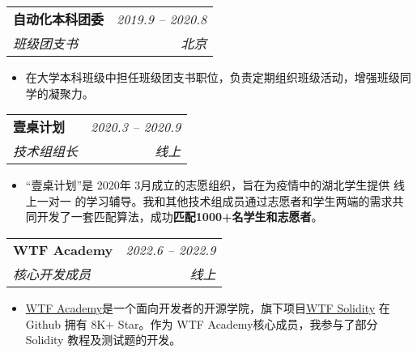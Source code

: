 \documentclass[letterpaper,11pt]{article}
\makeatletter
\newcommand{\resumeItemWithoutColon}[1]{
  \item\small{
    {#1 \vspace{-2pt}}
  }
}
\newcommand{\resumeSubheading}[4]{
  \vspace{0pt}\item
    \begin{tabular*}{0.97\textwidth}[t]{l@{\extracolsep{\fill}}r}
      \textbf{#1} & \textit{\small#2} \\
      \textit{\small#3} & \textit{\small #4} \\
    \end{tabular*}\vspace{-5pt}
}
\newcommand{\resumeItemListStart}{\begin{itemize}[leftmargin=*]}
\newcommand{\resumeItemListEnd}{\end{itemize}\vspace{-5pt}}
\makeatother
\begin{document}
   \resumeSubheading
    {自动化本科团委}{2019.9 -- 2020.8}
    {班级团支书}{北京}
      \resumeItemListStart
        \resumeItemWithoutColon{在大学本科班级中担任班级团支书职位，负责定期组织班级活动，增强班级同学的凝聚力。}
      \resumeItemListEnd
    
   \resumeSubheading
    {壹桌计划}{2020.3 -- 2020.9}
    {技术组组长}{线上}
      \resumeItemListStart
        \resumeItemWithoutColon{“壹桌计划”是 2020年 3月成立的志愿组织，旨在为疫情中的湖北学生提供 线上一对一 的学习辅导。我和其他技术组成员通过志愿者和学生两端的需求共同开发了一套匹配算法，成功\textbf{匹配1000+名学生和志愿者}。}
      \resumeItemListEnd
    
   \resumeSubheading
    {WTF Academy}{2022.6 -- 2022.9}
    {核心开发成员}{线上}
      \resumeItemListStart
        \resumeItemWithoutColon{\href{https://www.wtf.academy/}{WTF Academy}是一个面向开发者的开源学院，旗下项目\href{https://github.com/AmazingAng/WTF-Solidity}{WTF Solidity} 在 Github 拥有 8K+ Star。作为 WTF Academy核心成员，我参与了部分 Solidity 教程及测试题的开发。}
      \resumeItemListEnd
   
\fi




\end{document}
